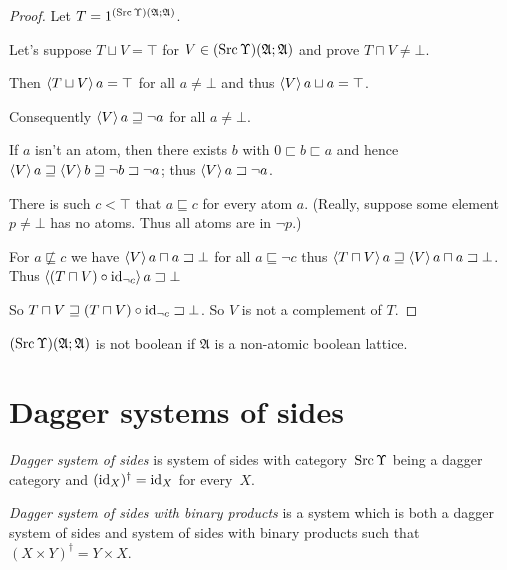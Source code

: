 \begin{proof}
  Let $T = 1^{(\operatorname{Src}\Upsilon)(\mathfrak{A}; \mathfrak{A})}$.
  
  Let's suppose $T \sqcup V = \top$ for $V \in (\operatorname{Src}\Upsilon) (\mathfrak{A};
  \mathfrak{A})$ and prove $T \sqcap V \neq \bot$.
  
  Then $\left\langle T \sqcup V\right\rangle a = \top$ for all $a \neq \bot$ and thus $\left\langle V\right\rangle
  a \sqcup a = \top$.
  
  Consequently $\left\langle V\right\rangle a \sqsupseteq \neg a$ for all $a \neq \bot$.
  
  If $a$ isn't an atom, then there exists $b$ with $0 \sqsubset b \sqsubset a$
  and hence $\left\langle V\right\rangle a \sqsupseteq \left\langle V\right\rangle b \sqsupseteq \neg b \sqsupset \neg a$;
  thus $\left\langle V\right\rangle a \sqsupset \neg a$.
  
  There is such $c < \top$ that $a \sqsubseteq c$ for every atom $a$. (Really,
  suppose some element $p \neq \bot$ has no atoms. Thus all atoms are in $\neg
  p$.)
  
  For $a \nsqsubseteq c$ we have $\left\langle V\right\rangle a \sqcap a \sqsupset \bot$
  for all $a \sqsubseteq \neg c$ thus $\left\langle T \sqcap V\right\rangle a \sqsupseteq
  \left\langle V\right\rangle a \sqcap a \sqsupset \bot$. Thus $\left\langle (T \sqcap V) \circ
  \operatorname{id}_{\neg c}\right\rangle a \sqsupset \bot$
  
  So $T \sqcap V \sqsupseteq (T \sqcap V) \circ \operatorname{id}_{\neg c} \sqsupset
  \bot$. So $V$ is not a complement of $T$.
\end{proof}

\begin{cor}
  $(\operatorname{Src}\Upsilon)(\mathfrak{A}; \mathfrak{A})$ is not boolean if $\mathfrak{A}$
  is a non-atomic boolean lattice.
\end{cor}

\section{Dagger systems of sides}

\begin{defn}
\emph{Dagger system of sides} is system of sides with category~$\operatorname{Src}\Upsilon$ being a dagger category
and $(\operatorname{id}_X)^\dagger = \operatorname{id}_X$ for every~$X$.
\end{defn}

\begin{defn}
\emph{Dagger system of sides with binary products} is a system which is both a dagger system of sides and system of sides with binary products
such that $(X\times Y)^\dagger = Y\times X$.
\end{defn}